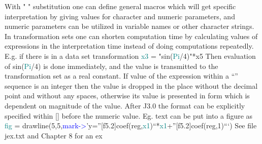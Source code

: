 With " " substitution one can define general macros which will get specific interpretation by 
giving values for character and numeric parameters, and numeric parameters can be utilized in 
variable names or other character strings. In transformation sets one can shorten computation 
time by calculating values of expressions in the interpretation time instead of doing 
computations repeatedly. E.g. if there is in a data set transformation 
\textcolor{teal}{x3} = "\textcolor{VioletRed}{sin}(\textcolor{teal}{Pi}/4)"*x5 
Then evaluation of \textcolor{VioletRed}{sin}(\textcolor{teal}{Pi}/4) is done immediately, and the value is transmitted to the 
transformation set as a real constant. 
If value of the expression within a “” sequence is an integer then the value is dropped in the 
place without the decimal point and without any spaces, otherwise its value is presented in 
form which is dependent on magnitude of the value. After J3.0 the format can be explicitly 
specified within [] before the numeric value. Eg. text can be put into a figure as 
\textcolor{teal}{fig} = 
\textcolor{VioletRed}{drawline}(5,5,\textcolor{blue}{mark->}’y=”[f5.2]coef(reg,\textcolor{teal}{x1})“*\textcolor{teal}{x1}+”[f5.2]coef(reg,1)“‘) 
See file jex.txt and Chapter 8 for an ex 
